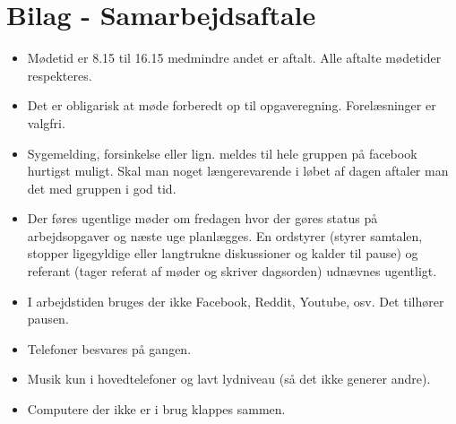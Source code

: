 \chapter{Bilag - Samarbejdsaftale}
\label{Bilag1}

\begin{itemize}
	\item Mødetid er 8.15 til 16.15 medmindre andet er aftalt. Alle aftalte mødetider respekteres.
	\item Det er obligarisk at møde forberedt op til opgaveregning. Forelæsninger er valgfri.
	\item Sygemelding, forsinkelse eller lign. meldes til hele gruppen på facebook hurtigst muligt. Skal man noget længerevarende i løbet af dagen aftaler man det med gruppen i god tid.
	\item Der føres ugentlige møder om fredagen hvor der gøres status på arbejdsopgaver og næste uge planlægges. En ordstyrer (styrer samtalen, stopper ligegyldige eller langtrukne diskussioner og kalder til pause) og referant (tager referat af møder og skriver dagsorden) udnævnes ugentligt.	
	\item  I arbejdstiden bruges der ikke Facebook, Reddit, Youtube, osv. Det tilhører pausen. 
	\item Telefoner besvares på gangen.
	\item Musik kun i hovedtelefoner og lavt lydniveau (så det ikke generer andre).
	\item Computere der ikke er i brug klappes sammen.
\end{itemize}
 \clearpage
